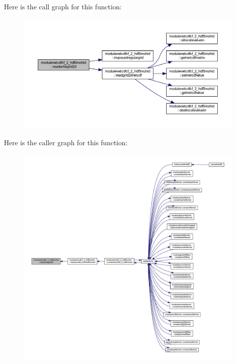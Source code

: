 Here is the call graph for this function\+:\nopagebreak
\begin{figure}[H]
\begin{center}
\leavevmode
\includegraphics[width=350pt]{namespacemodulenetcdfcf__2__hdf5mohid_a676c74281acb5193758be5405b7e6310_cgraph}
\end{center}
\end{figure}
Here is the caller graph for this function\+:\nopagebreak
\begin{figure}[H]
\begin{center}
\leavevmode
\includegraphics[width=350pt]{namespacemodulenetcdfcf__2__hdf5mohid_a676c74281acb5193758be5405b7e6310_icgraph}
\end{center}
\end{figure}
\mbox{\label{namespacemodulenetcdfcf__2__hdf5mohid_a80bb913f46008900376c9030ad45a641}} 
